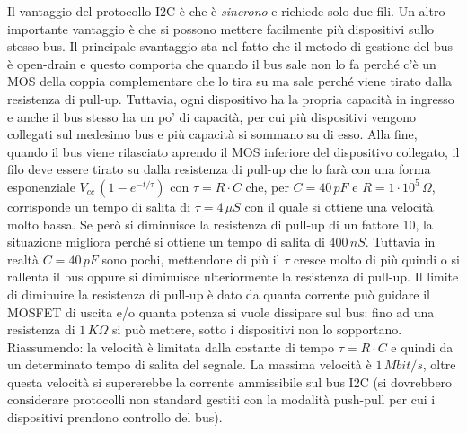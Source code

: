 \documentclass[12pt, a4paper]{report}
\begin{document}
Il vantaggio del protocollo I2C è che è \textit{sincrono} e richiede solo due fili. Un altro importante vantaggio è che si possono mettere facilmente più dispositivi sullo stesso bus. Il principale svantaggio sta nel fatto che il metodo di gestione del bus è open-drain e questo comporta che quando il bus sale non lo fa perché c'è un MOS della coppia complementare che lo tira su ma sale perché viene tirato dalla resistenza di pull-up. Tuttavia, ogni dispositivo ha la propria capacità in ingresso e anche il bus stesso ha un po' di capacità, per cui più dispositivi vengono collegati sul medesimo bus e più capacità si sommano su di esso. Alla fine, quando il bus viene rilasciato aprendo il MOS inferiore del dispositivo collegato, il filo deve essere tirato su dalla resistenza di pull-up che lo farà con una forma esponenziale $V_{cc}\,(1 - e^{-t/\tau})$ con $\tau = R \cdot C$ che, per $C = 40\,pF$ e $R = 1 \cdot 10^{5}\,\Omega$, corrisponde un tempo di salita di $\tau = 4\,\mu S$ con il quale si ottiene una velocità molto bassa. Se però si diminuisce la resistenza di pull-up di un fattore 10, la situazione migliora perché si ottiene un tempo di salita di $400\,nS$. Tuttavia in realtà $C = 40\,pF$ sono pochi, mettendone di più il $\tau$ cresce molto di più quindi o si rallenta il bus oppure si diminuisce ulteriormente la resistenza di pull-up. Il limite di diminuire la resistenza di pull-up è dato da quanta corrente può guidare il MOSFET di uscita e/o quanta potenza si vuole dissipare sul bus: fino ad una resistenza di $1\,K\Omega$ si può mettere, sotto i dispositivi non lo sopportano. Riassumendo: la velocità è limitata dalla costante di tempo $\tau = R \cdot C$ e quindi da un determinato tempo di salita del segnale. La massima velocità è $1\,\textit{Mbit/s}$, oltre questa velocità si supererebbe la corrente ammissibile sul bus I2C (si dovrebbero considerare protocolli non standard gestiti con la modalità push-pull per cui i dispositivi prendono controllo del bus).
\end{document}
